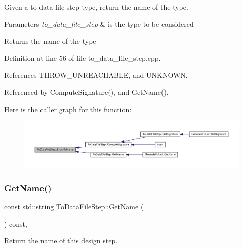 Given a to data file step type, return the name of the type. 


\begin{DoxyParams}{Parameters}
{\em to\+\_\+data\+\_\+file\+\_\+step} & is the type to be considered \\
\hline
\end{DoxyParams}
\begin{DoxyReturn}{Returns}
the name of the type 
\end{DoxyReturn}


Definition at line 56 of file to\+\_\+data\+\_\+file\+\_\+step.\+cpp.



References T\+H\+R\+O\+W\+\_\+\+U\+N\+R\+E\+A\+C\+H\+A\+B\+LE, and U\+N\+K\+N\+O\+WN.



Referenced by Compute\+Signature(), and Get\+Name().

Here is the caller graph for this function\+:
\nopagebreak
\begin{figure}[H]
\begin{center}
\leavevmode
\includegraphics[width=350pt]{d6/d54/classToDataFileStep_a6404e3b2da6df6092e064f5d462186d4_icgraph}
\end{center}
\end{figure}
\mbox{\label{classToDataFileStep_ada4a3271187ee310379405eaaefc24e1}} 
\subsubsection{\texorpdfstring{Get\+Name()}{GetName()}}
{\footnotesize\ttfamily const std\+::string To\+Data\+File\+Step\+::\+Get\+Name (\begin{DoxyParamCaption}{ }\end{DoxyParamCaption}) const\hspace{0.3cm}{\ttfamily [override]}, {\ttfamily [virtual]}}



Return the name of this design step. 

